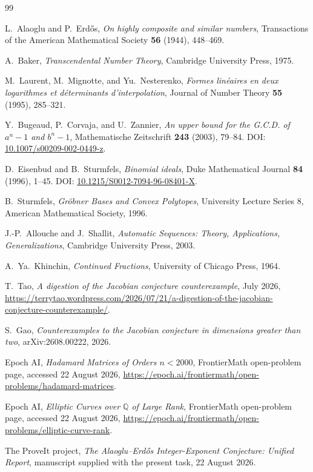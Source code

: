\documentclass[11pt,oneside]{article}
\theoremstyle{definition}
\theoremstyle{remark}
\begin{document}
\begin{thebibliography}{99}

L.~Alaoglu and P.~Erd\H{o}s,
\newblock \emph{On highly composite and similar numbers},
\newblock Transactions of the American Mathematical Society \textbf{56} (1944), 448--469.

A.~Baker,
\newblock \emph{Transcendental Number Theory},
\newblock Cambridge University Press, 1975.

M.~Laurent, M.~Mignotte, and Yu.~Nesterenko,
\newblock \emph{Formes lin\'eaires en deux logarithmes et d\'eterminants d'interpolation},
\newblock Journal of Number Theory \textbf{55} (1995), 285--321.

Y.~Bugeaud, P.~Corvaja, and U.~Zannier,
\newblock \emph{An upper bound for the G.C.D. of $a^n-1$ and $b^n-1$},
\newblock Mathematische Zeitschrift \textbf{243} (2003), 79--84.
\newblock DOI: \href{https://doi.org/10.1007/s00209-002-0449-z}{10.1007/s00209-002-0449-z}.

D.~Eisenbud and B.~Sturmfels,
\newblock \emph{Binomial ideals},
\newblock Duke Mathematical Journal \textbf{84} (1996), 1--45.
\newblock DOI: \href{https://doi.org/10.1215/S0012-7094-96-08401-X}{10.1215/S0012-7094-96-08401-X}.

B.~Sturmfels,
\newblock \emph{Gr\"obner Bases and Convex Polytopes},
\newblock University Lecture Series 8, American Mathematical Society, 1996.

J.-P.~Allouche and J.~Shallit,
\newblock \emph{Automatic Sequences: Theory, Applications, Generalizations},
\newblock Cambridge University Press, 2003.

A.~Ya.~Khinchin,
\newblock \emph{Continued Fractions},
\newblock University of Chicago Press, 1964.

T.~Tao,
\newblock \emph{A digestion of the Jacobian conjecture counterexample},
 July 2026,
\newblock \url{https://terrytao.wordpress.com/2026/07/21/a-digestion-of-the-jacobian-conjecture-counterexample/}.

S.~Gao,
\newblock \emph{Counterexamples to the Jacobian conjecture in dimensions greater than two},
\newblock arXiv:2608.00222, 2026.

Epoch AI,
\newblock \emph{Hadamard Matrices of Orders $n<2000$}, FrontierMath open-problem page,
\newblock accessed 22 August 2026,
\newblock \url{https://epoch.ai/frontiermath/open-problems/hadamard-matrices}.

Epoch AI,
\newblock \emph{Elliptic Curves over $\mathbb Q$ of Large Rank}, FrontierMath open-problem page,
\newblock accessed 22 August 2026,
\newblock \url{https://epoch.ai/frontiermath/open-problems/elliptic-curve-rank}.

The ProveIt project,
\newblock \emph{The Alaoglu--Erd\H{o}s Integer-Exponent Conjecture: Unified Report},
\newblock manuscript supplied with the present task, 22 August 2026.

\end{thebibliography}
\end{document}
